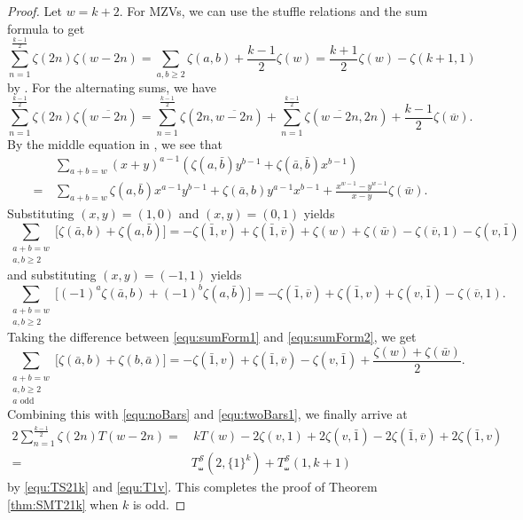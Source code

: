 \documentclass{article}
\newcommand{\sha}{\shuffle}
\newcommand{\Sy}{{\mathcal S}}
\theoremstyle{plain}
\theoremstyle{definition}
\begin{document}
\begin{proof}
Let $w=k+2$. For MZVs, we can use the stuffle relations and the sum formula to get
\begin{equation}\label{equ:noBars}
\sum_{n=1}^{\frac{k-1}{2}}\zeta(2n)\zeta(w-2n) = \sum_{a,b\ge 2}\zeta(a,b)+\frac{k-1}{2}\zeta(w)=\frac{k+1}{2}\zeta(w)-\zeta(k+1,1)
\end{equation}
by \cite[Thm. 1]{GanglKaZa2006}. For the alternating sums, we have
\begin{equation}\label{equ:twoBars1}
\sum_{n=1}^{\frac{k-1}{2}}\zeta(2n)\zeta(\overline{w-2n})=\sum_{n=1}^{\frac{k-1}{2}} \zeta(2n,\overline{w-2n})+\sum_{n=1}^{\frac{k-1}{2}}\zeta(\overline{w-2n},2n)+\frac{k-1}{2}\zeta(\overline{w}).
\end{equation}
By the middle equation in \cite[Prop. 4.1]{BCJXXZhao2020c}, we see that
\begin{align*}
&\,\sum_{a+b=w}(x+y)^{a-1}(\zeta(a,\bar b)y^{b-1}+\zeta(\bar a, \bar b)x^{b-1})\\
=&\, \sum_{a+b=w}\zeta(a,\bar b)x^{a-1}y^{b-1}+\zeta(\bar a,b)y^{a-1} x^{b-1}+\frac{x^{w-1}-y^{w-1}}{x-y}\zeta(\bar w).
\end{align*}
Substituting $(x,y)=(1,0)$ and $(x,y)=(0,1)$ yields
\begin{equation}\label{equ:sumForm1}
\sum_{\substack{a+b=w \\a,b\ge 2}}\Big[\zeta(\bar a, b)+\zeta(a,\bar b)\Big]=-\zeta(\bar 1, v)+\zeta(\bar 1,\overline{v})+\zeta(w)+\zeta(\bar w)-\zeta(\overline{v},1)-\zeta(v,\bar 1)
\end{equation}
and substituting $(x,y)=(-1,1)$ yields
\begin{equation}\label{equ:sumForm2}
\sum_{\substack{a+b=w \\ a,b\ge 2}}\Big[(-1)^a\zeta(\bar a, b)+(-1)^b\zeta(a,\bar b)\Big]=-\zeta(\bar 1, \overline{v})+\zeta(\bar 1, v)+\zeta(v,\bar 1)-\zeta(\overline{v}, 1).
\end{equation}
Taking the difference between \eqref{equ:sumForm1} and \eqref{equ:sumForm2}, we get
\begin{equation}\label{equ:twoBars}
    \sum_{\substack{a+b=w \\ a,b\ge 2\\ a\text{ odd}}} \Big[\zeta(\bar a, b)+\zeta(b,\bar a)\Big] = -\zeta(\bar 1,v)+\zeta(\bar 1,\overline{v})-\zeta(v,\bar 1)+\frac{\zeta(w)+\zeta(\bar w)}{2}.
\end{equation}
Combining this with \eqref{equ:noBars} and \eqref{equ:twoBars1}, we finally arrive at
\begin{align*}
2\sum_{n=1}^{\frac{k-1}{2}}\zeta(2n)T(w-2n)
=&\, kT(w)-2\zeta(v,1)+2\zeta(v,\bar 1)-2\zeta(\bar 1,\overline{v})+2\zeta(\bar 1,v) \\
=&T_\sha^\Sy(2,\{1\}^k)+T_\sha^\Sy(1,k+1)
\end{align*}
by \eqref{equ:TS21k} and \eqref{equ:T1v}.
This completes the proof of Theorem \ref{thm:SMT21k} when $k$ is odd.


\end{proof}
\end{document}
